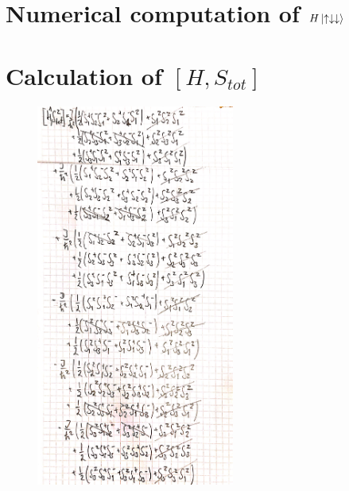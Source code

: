 \documentclass{article}
\begin{document}
\pagebreak
\begin{appendix}
\section{Numerical computation of $H\ket{\uparrow\downarrow\downarrow}$}
\label{app:updndn}


\pagebreak
\section{Calculation of $[H,S_{tot}]$}
\label{app:prob1.5}
\begin{figure}[ht]
	\centering
	\includegraphics[width=0.58\textwidth]{figures/Problem1_5_1.jpg}
\end{figure}


\end{appendix}
\end{document}
